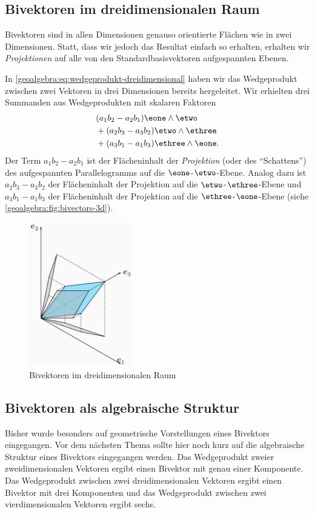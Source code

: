 \subsection{Bivektoren im dreidimensionalen Raum}
Bivektoren sind in allen Dimensionen genauso orientierte Flächen wie in zwei Dimensionen.
Statt, dass wir jedoch das Resultat einfach so erhalten, erhalten wir \emph{Projektionen}
auf alle von den Standardbasisvektoren aufgespannten Ebenen.

In \eqref{geoalgebra:eq:wedgeprodukt-dreidimensional} haben wir das Wedgeprodukt zwischen zwei Vektoren
in drei Dimensionen bereits hergeleitet. Wir erhielten drei Summanden aus Wedgeprodukten mit skalaren Faktoren
\begin{align*}
&(a_1 b_2 - a_2 b_1) \eone \wedge \etwo \\
  &+(a_2 b_3 - a_3 b_2) \etwo \wedge \ethree \\
  &+(a_3 b_1 - a_1 b_3) \ethree \wedge \eone.
\end{align*}
Der Term $a_1 b_2 - a_2 b_1$ ist der Flächeninhalt der \emph{Projektion} (oder des ``Schattens'') des aufgespannten Parallelogramms auf die $\eone$-$\etwo$-Ebene.
Analog dazu ist $a_2 b_3 - a_3 b_2$ der Flächeninhalt der Projektion auf die $\etwo$-$\ethree$-Ebene und $a_3 b_1 - a_1 b_3$ der Flächeninhalt
der Projektion auf die $\ethree$-$\eone$-Ebene (siehe \autoref{geoalgebra:fig:bivectors-3d}).

\begin{figure}[h]
  \centering
  \includegraphics[width=0.4\textwidth]{papers/geoalgebra/assets/bivectors-3d.png}
  \caption{Bivektoren im dreidimensionalen Raum}
  \label{geoalgebra:fig:bivectors-3d}
\end{figure}

\subsection{Bivektoren als algebraische Struktur}
Bisher wurde besonders auf geometrische Vorstellungen eines Bivektors eingegangen. Vor dem nächsten Thema sollte hier noch kurz
auf die algebraische Struktur eines Bivektors eingegangen werden. Das Wedgeprodukt zweier zweidimensionalen Vektoren ergibt
einen Bivektor mit genau einer Komponente. Das Wedgeprodukt zwischen zwei dreidimensionalen Vektoren ergibt einen Bivektor mit drei Komponenten
und das Wedgeprodukt zwischen
zwei vierdimensionalen Vektoren ergibt sechs.

